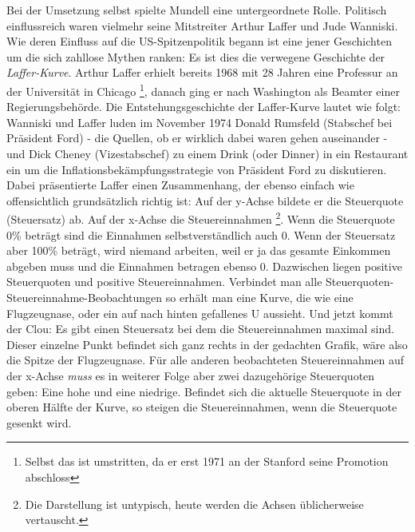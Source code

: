 Bei der Umsetzung selbst spielte Mundell eine untergeordnete Rolle. Politisch einflussreich waren vielmehr seine Mitstreiter Arthur Laffer und Jude Wanniski. Wie deren Einfluss auf die US-Spitzenpolitik begann ist eine jener Geschichten um die sich zahllose Mythen ranken: Es ist dies die verwegene Geschichte der \textit{Laffer-Kurve}.
Arthur Laffer erhielt bereits 1968 mit 28 Jahren eine Professur an der Universität in Chicago \footnote{Selbst das ist umstritten, da er erst 1971 an der Stanford seine Promotion abschloss}, danach ging er nach Washington als Beamter einer Regierungsbehörde.
Die Entstehungsgeschichte der Laffer-Kurve lautet wie folgt: Wanniski und Laffer luden im November 1974 Donald Rumsfeld (Stabschef bei Präsident Ford) - die Quellen, ob er wirklich dabei waren gehen auseinander -  und Dick Cheney (Vizestabschef) zu einem Drink (oder Dinner) in ein Restaurant ein um die Inflationsbekämpfungsstrategie von Präsident Ford zu diskutieren. Dabei präsentierte Laffer einen Zusammenhang, der ebenso einfach wie offensichtlich grundsätzlich richtig ist: Auf der y-Achse bildete er die Steuerquote (Steuersatz) ab. Auf der x-Achse die Steuereinnahmen \footnote{Die Darstellung ist untypisch, heute werden die Achsen üblicherweise vertauscht.}. Wenn die Steuerquote 0\% beträgt sind die Einnahmen selbstverständlich auch 0. Wenn der Steuersatz aber 100\% beträgt, wird niemand arbeiten, weil er ja das gesamte Einkommen abgeben muss und die Einnahmen betragen ebenso 0. Dazwischen liegen positive Steuerquoten und positive Steuereinnahmen. Verbindet man alle Steuerquoten-Steuereinnahme-Beobachtungen so erhält man eine Kurve, die wie eine Flugzeugnase, oder ein auf nach hinten gefallenes U aussieht. Und jetzt kommt der Clou: Es gibt einen Steuersatz bei dem die Steuereinnahmen maximal sind. Dieser einzelne Punkt befindet sich ganz rechts in der gedachten Grafik, wäre also die Spitze der Flugzeugnase. Für alle anderen beobachteten Steuereinnahmen auf der x-Achse \textit{muss} es in weiterer Folge aber zwei dazugehörige Steuerquoten geben: Eine hohe und eine niedrige. Befindet sich die aktuelle Steuerquote in der oberen Hälfte der Kurve, so steigen die Steuereinnahmen, wenn die Steuerquote gesenkt wird.

